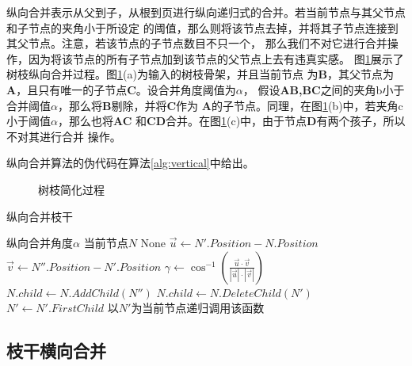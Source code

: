 纵向合并表示从父到子，从根到页进行纵向递归式的合并。若当前节点与其父节点和子节点的夹角小于所设定
的阈值，那么则将该节点去掉，并将其子节点连接到其父节点。注意，若该节点的子节点数目不只一个，
那么我们不对它进行合并操作，因为将该节点的所有子节点加到该节点的父节点上去有违真实感。
图\ref{fig:vert}展示了树枝纵向合并过程。图\ref{fig:vert}(a)为输入的树枝骨架，并且当前节点
为\textbf{B}，其父节点为\textbf{A}，且只有唯一的子节点\textbf{C}。设合并角度阈值为$\alpha$，
假设\textbf{AB,BC}之间的夹角b小于合并阈值$\alpha$，那么将\textbf{B}剔除，并将\textbf{C}作为
\textbf{A}的子节点。同理，在图\ref{fig:vert}(b)中，若夹角c小于阈值$\alpha$，那么也将\textbf{AC}
和\textbf{CD}合并。在图\ref{fig:vert}(c)中，由于节点\textbf{D}有两个孩子，所以不对其进行合并
操作。

纵向合并算法的伪代码在算法\ref{alg:vertical}中给出。

\begin{figure}[H]
	\centering
\hspace{4em}
\hspace{4em}
	\caption{树枝简化过程}
	\label{fig:vert}
\end{figure}

\begin{algorithm}[H]
	\caption{纵向合并枝干}
	\label{alg:vertical}
	\begin{algorithmic}[1] 
		\Require 纵向合并角度$\alpha$
		\Require 当前节点$N$
		\Ensure None
		\State $\vec{u} \gets N'.Position-N.Position$
		\State $\vec{v} \gets N''.Position-N'.Position$
		\State $\gamma \gets \cos^{-1}({\frac{\vec{u} \cdot \vec{v}}{|\vec{u}|\cdot|\vec{v}|}})$
		\If{$\gamma<\alpha$}
		\State $N.child \gets N.AddChild(N'')$
		\State $N.child \gets N.DeleteChild(N') $
		\EndIf
		\State $N' \gets N'.FirstChild$
		\EndWhile
		\EndFor
		\State 以$N'$为当前节点递归调用该函数
		\EndFor
		\EndIf
	\end{algorithmic}
\end{algorithm}

\subsection{枝干横向合并}

